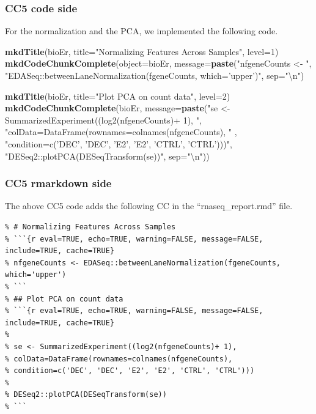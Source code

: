 \documentclass[]{article}
\newenvironment{Shaded}{\begin{snugshade}}{\end{snugshade}}
\newcommand{\CharTok}[1]{\textcolor[rgb]{0.31,0.60,0.02}{#1}}
\newcommand{\DataTypeTok}[1]{\textcolor[rgb]{0.13,0.29,0.53}{#1}}
\newcommand{\DecValTok}[1]{\textcolor[rgb]{0.00,0.00,0.81}{#1}}
\newcommand{\KeywordTok}[1]{\textcolor[rgb]{0.13,0.29,0.53}{\textbf{#1}}}
\newcommand{\NormalTok}[1]{#1}
\newcommand{\StringTok}[1]{\textcolor[rgb]{0.31,0.60,0.02}{#1}}
\begin{document}
\hypertarget{cc5-code-side}{%
\subsubsection{CC5 code side}\label{cc5-code-side}}

For the normalization and the PCA, we implemented the following code.

\begin{Shaded}
\begin{Highlighting}[]
\KeywordTok{mkdTitle}\NormalTok{(bioEr, }\DataTypeTok{title=}\StringTok{"Normalizing Features Across Samples"}\NormalTok{, }\DataTypeTok{level=}\DecValTok{1}\NormalTok{)}
\KeywordTok{mkdCodeChunkComplete}\NormalTok{(}\DataTypeTok{object=}\NormalTok{bioEr, }\DataTypeTok{message=}\KeywordTok{paste}\NormalTok{(}\StringTok{"nfgeneCounts <- "}\NormalTok{,}
              \StringTok{"EDASeq::betweenLaneNormalization(fgeneCounts, which='upper')"}\NormalTok{, }\DataTypeTok{sep=}\StringTok{"}\CharTok{\textbackslash{}n}\StringTok{"}\NormalTok{)}

\KeywordTok{mkdTitle}\NormalTok{(bioEr, }\DataTypeTok{title=}\StringTok{"Plot PCA on count data"}\NormalTok{, }\DataTypeTok{level=}\DecValTok{2}\NormalTok{)}
\KeywordTok{mkdCodeChunkComplete}\NormalTok{(bioEr, }\DataTypeTok{message=}\KeywordTok{paste}\NormalTok{(}\StringTok{"se <- SummarizedExperiment((log2(nfgeneCounts)+ 1), "}\NormalTok{,}
                \StringTok{"colData=DataFrame(rownames=colnames(nfgeneCounts), "}\NormalTok{ ,}
                \StringTok{"condition=c('DEC', 'DEC', 'E2', 'E2', 'CTRL', 'CTRL')))"}\NormalTok{,}
                \StringTok{"DESeq2::plotPCA(DESeqTransform(se))"}\NormalTok{, }\DataTypeTok{sep=}\StringTok{"}\CharTok{\textbackslash{}n}\StringTok{"}\NormalTok{))}
\end{Highlighting}
\end{Shaded}

\hypertarget{cc5-rmarkdown-side}{%
\subsubsection{CC5 rmarkdown side}\label{cc5-rmarkdown-side}}

The above CC5 code adds the following CC in the ``rnaseq\_report.rmd''
file.

\begin{verbatim}
% # Normalizing Features Across Samples
% ```{r eval=TRUE, echo=TRUE, warning=FALSE, message=FALSE, include=TRUE, cache=TRUE}
% nfgeneCounts <- EDASeq::betweenLaneNormalization(fgeneCounts, which='upper')
% ```
% ## Plot PCA on count data
% ```{r eval=TRUE, echo=TRUE, warning=FALSE, message=FALSE, include=TRUE, cache=TRUE}
% 
% se <- SummarizedExperiment((log2(nfgeneCounts)+ 1),
% colData=DataFrame(rownames=colnames(nfgeneCounts), 
% condition=c('DEC', 'DEC', 'E2', 'E2', 'CTRL', 'CTRL')))
% 
% DESeq2::plotPCA(DESeqTransform(se))
% ```
\end{verbatim}
\end{document}
